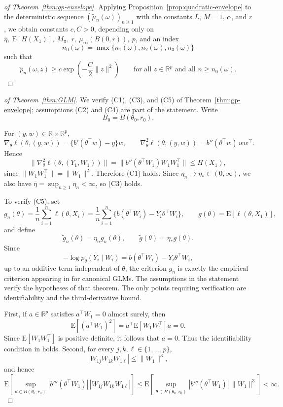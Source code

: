 \documentclass[11pt]{article}
\theoremstyle{plain}
\theoremstyle{definition}
\theoremstyle{remark}
\begin{document}
\begin{proof}[of Theorem~\ref{thm:gp-envelope}]
Applying Proposition~\ref{prop:quadratic-envelope} to the deterministic
sequence $(\tilde\mu_n(\omega))_{n\ge1}$ with the constants $L$, $M=1$,
$\alpha$, and $r$, we obtain constants $c,C>0$, depending only
on $\bar{\eta},~\mathrm{E}[H(X_{1})],~M_{\pi},~r,~\mu_{\infty}(B(0,r)),~p$,
and an index
\[
n_{0}(\omega)=\max\{n_{1}(\omega),n_{2}(\omega),n_{3}(\omega)\}
\]
such that
\[
\tilde p_{n}(\omega,z)\ge c\exp\left(-\frac{C}{2}\|z\|^{2}\right)\qquad\text{for all }z\in\mathbb{R}^{p}\text{ and all }n\ge n_{0}(\omega).
\]
\end{proof}

\begin{proof}[of Theorem~\ref{thm:GLM}] We verify {(C1)},
{(C3)}, and {(C5)} of Theorem~\ref{thm:gp-envelope}; assumptions
{(C2)} and {(C4)} are part of the statement. Write
\[
B_0=B(\theta_{0},r_{0}).
\]

For $(y,w)\in\mathbb{R}\times\mathbb{R}^{p}$,
\[
\nabla_{\theta}\ell(\theta,(y,w))=\{b'(\theta^{\top}w)-y\}w,\qquad\nabla_{\theta}^{2}\ell(\theta,(y,w))=b''(\theta^{\top}w)\,ww^{\top}.
\]
Hence
\[
\|\nabla_{\theta}^{2}\ell(\theta,(Y_{1},W_{1}))\|=\|b''(\theta^{\top}W_{1})W_{1}W_{1}^{\top}\|\le H(X_{1}),
\]
since $\|W_{1}W_{1}^{\top}\|=\|W_{1}\|^{2}$. Therefore {(C1)}
holds. Since $\eta_{n}\to\eta_{*}\in(0,\infty)$, we also have $\bar{\eta}=\sup_{n\ge1}\eta_{n}<\infty$,
so {(C3)} holds.

To verify {(C5)}, set
\[
g_{n}(\theta)=\frac{1}{n}\sum_{i=1}^{n}\ell(\theta,X_{i})=\frac{1}{n}\sum_{i=1}^{n}\{b(\theta^{\top}W_{i})-Y_{i}\theta^{\top}W_{i}\},\qquad g(\theta)=\mathrm{E}[\ell(\theta,X_{1})],
\]
and define
\[
\tilde{g}_{n}(\theta)=\eta_{n}g_{n}(\theta),\qquad\tilde{g}(\theta)=\eta_{*}g(\theta).
\]
Since
\[
-\log p_{\theta}(Y_{i}\mid W_{i})=b(\theta^{\top}W_{i})-Y_{i}\theta^{\top}W_{i},
\]
up to an additive term independent of $\theta$, the criterion $g_{n}$
is exactly the empirical criterion appearing in \citet[Thm.~13]{miller2021generalized_posteriors}
for canonical GLMs. The assumptions in the statement verify
the hypotheses of that theorem. The only points requiring verification
are identifiability and the third-derivative bound.

First, if $a\in\mathbb{R}^{p}$ satisfies $a^{\top}W_{1}=0$ almost
surely, then
\[
\mathrm{E}[(a^{\top}W_{1})^{2}]=a^{\top}\mathrm{E}[W_{1}W_{1}^{\top}]a=0.
\]
Since $\mathrm{E}[W_{1}W_{1}^{\top}]$ is positive definite, it follows
that $a=0$. Thus the identifiability condition in \citet[Thm.~13]{miller2021generalized_posteriors}
holds. Second, for every $j,k,\ell\in\{1,\ldots,p\}$,
\[
|W_{1j}W_{1k}W_{1\ell}|\le\|W_{1}\|^{3},
\]
and hence
\[
\mathrm{E}\!\left[\sup_{\theta\in\overline{B}(\theta_{0},r_{0})}|b'''(\theta^{\top}W_{1})|\,|W_{1j}W_{1k}W_{1\ell}|\right]\le\mathrm{E}\!\left[\sup_{\theta\in\overline{B}(\theta_{0},r_{0})}|b'''(\theta^{\top}W_{1})|\,\|W_{1}\|^{3}\right]<\infty.
\]


\end{proof}
\end{document}
